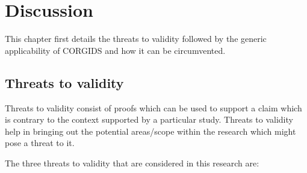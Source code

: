 
\chapter{\textbf{Discussion}}
\label{sec7:Discussion}
This chapter first details the threats to validity followed by the generic applicability of \ac{CORGIDS} and how it can be circumvented.

\section{Threats to validity}
Threats to validity consist of proofs which can be used to support a claim which is contrary to the context supported by a particular study. Threats to validity help in bringing out the potential areas/scope within the research which might pose a threat to it.

The three threats to validity that are considered in this research are:

